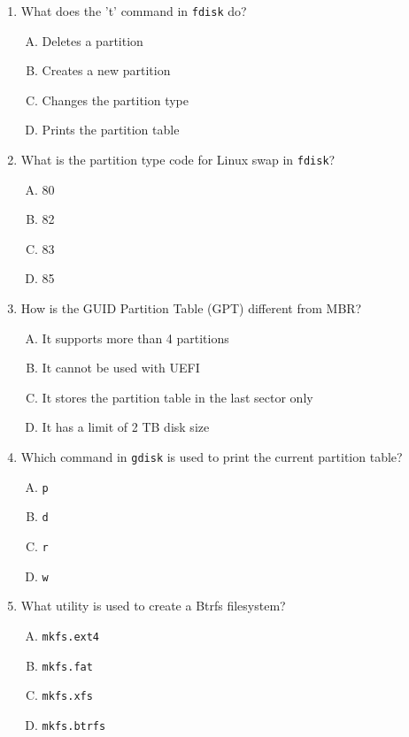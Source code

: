 \documentclass[a4paper]{report}
\begin{document}
\begin{enumerate}[1.]
    \item What does the 't' command in \texttt{fdisk} do?  
    \begin{enumerate}[A)]
        \item Deletes a partition  
        \item Creates a new partition  
        \item Changes the partition type  
        \item Prints the partition table  
    \end{enumerate}

    \item What is the partition type code for Linux swap in \texttt{fdisk}?  
    \begin{enumerate}[A)]
        \item 80  
        \item 82  
        \item 83  
        \item 85  
    \end{enumerate}

    \item How is the GUID Partition Table (GPT) different from MBR?  
    \begin{enumerate}[A)]
        \item It supports more than 4 partitions  
        \item It cannot be used with UEFI  
        \item It stores the partition table in the last sector only  
        \item It has a limit of 2 TB disk size  
    \end{enumerate}

    \item Which command in \texttt{gdisk} is used to print the current partition table?  
    \begin{enumerate}[A)]
        \item \texttt{p}  
        \item \texttt{d}  
        \item \texttt{r}  
        \item \texttt{w}  
    \end{enumerate}

    \item What utility is used to create a Btrfs filesystem?  
    \begin{enumerate}[A)]
        \item \texttt{mkfs.ext4}  
        \item \texttt{mkfs.fat}  
        \item \texttt{mkfs.xfs}  
        \item \texttt{mkfs.btrfs}  
    \end{enumerate}


\end{enumerate}
\end{document}
